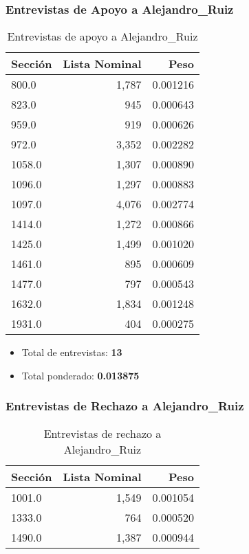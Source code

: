 \documentclass[a4paper,12pt]{article}
\begin{document}
\subsubsection*{Entrevistas de Apoyo a Alejandro_Ruiz}
\begin{table}[h]
\centering
\begin{tabular}{lrr}
\toprule
Sección & Lista Nominal & Peso \\ \midrule
800.0 & 1,787 & 0.001216 \\ 
823.0 & 945 & 0.000643 \\ 
959.0 & 919 & 0.000626 \\ 
972.0 & 3,352 & 0.002282 \\ 
1058.0 & 1,307 & 0.000890 \\ 
1096.0 & 1,297 & 0.000883 \\ 
1097.0 & 4,076 & 0.002774 \\ 
1414.0 & 1,272 & 0.000866 \\ 
1425.0 & 1,499 & 0.001020 \\ 
1461.0 & 895 & 0.000609 \\ 
1477.0 & 797 & 0.000543 \\ 
1632.0 & 1,834 & 0.001248 \\ 
1931.0 & 404 & 0.000275 \\ 
\bottomrule
\end{tabular}
\caption{Entrevistas de apoyo a Alejandro_Ruiz}
\end{table}

\begin{itemize}
\item Total de entrevistas: \textbf{13}
\item Total ponderado: \textbf{0.013875}
\end{itemize}

\subsubsection*{Entrevistas de Rechazo a Alejandro_Ruiz}
\begin{table}[h]
\centering
\begin{tabular}{lrr}
\toprule
Sección & Lista Nominal & Peso \\ \midrule
1001.0 & 1,549 & 0.001054 \\ 
1333.0 & 764 & 0.000520 \\ 
1490.0 & 1,387 & 0.000944 \\ 
\bottomrule
\end{tabular}
\caption{Entrevistas de rechazo a Alejandro_Ruiz}
\end{table}
\end{document}
